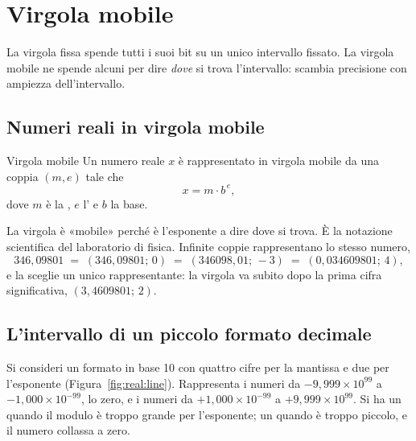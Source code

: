 \section{Virgola mobile}

La virgola fissa spende tutti i suoi bit su un unico intervallo fissato. La
virgola mobile ne spende alcuni per dire \emph{dove} si trova l'intervallo:
scambia precisione con ampiezza dell'intervallo.

\subsection{Numeri reali in virgola mobile}

\begin{definition}{Virgola mobile}
Un numero reale $x$ è rappresentato in virgola mobile da una coppia $(m,e)$
tale che
\[ x = m\cdot b^{\,e}, \]
dove $m$ è la , $e$ l' e $b$ la base.
\end{definition}

La virgola è «mobile» perché è l'esponente a dire dove si trova. È la notazione
scientifica del laboratorio di fisica. Infinite coppie rappresentano lo stesso
numero,
\[
346,09801 \;=\; (346,09801;\,0) \;=\; (346098,01;\,-3) \;=\; (0,034609801;\,4),
\]
e la  sceglie un unico rappresentante: la virgola va
subito dopo la prima cifra significativa, $(3,4609801;\,2)$.

\subsection{L'intervallo di un piccolo formato decimale}

Si consideri un formato in base 10 con quattro cifre per la mantissa e due per
l'esponente (Figura~\ref{fig:real:line}). Rappresenta i numeri da
$-9,999\times 10^{99}$ a $-1,000\times 10^{-99}$, lo zero, e i numeri da
$+1,000\times 10^{-99}$ a $+9,999\times 10^{99}$. Si ha un 
quando il modulo è troppo grande per l'esponente; un  quando è
troppo piccolo, e il numero collassa a zero.

